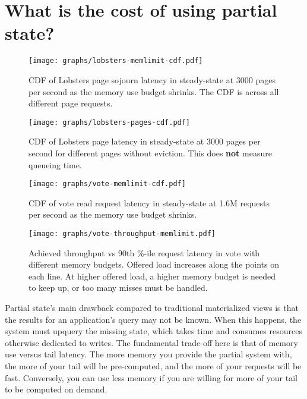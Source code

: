 \section{What is the cost of using partial state?}
\label{s:eval:cost}

\begin{figure}[h]
  \centering
  \texttt{[image: graphs/lobsters-memlimit-cdf.pdf]}
  \caption{CDF of Lobsters page sojourn latency in steady-state at 3000 pages
  per second as the memory use budget shrinks. The CDF is across all different
  page requests.}
  \label{f:lobsters-mem-latency}
\end{figure}

\begin{figure}[h]
  \centering
  \texttt{[image: graphs/lobsters-pages-cdf.pdf]}
  \caption{CDF of Lobsters page latency in steady-state at 3000 pages per second
  for different pages without eviction. This does \textbf{not} measure queueing
  time.}
  \label{f:lobsters-pages-latency}
\end{figure}

\begin{figure}[h]
  \centering
  \texttt{[image: graphs/vote-memlimit-cdf.pdf]}
  \caption{CDF of vote read request latency in steady-state at 1.6M requests per
  second as the memory use budget shrinks.}
  \label{f:vote-mem-latency}
\end{figure}

\begin{figure}[h]
  \centering
  \texttt{[image: graphs/vote-throughput-memlimit.pdf]}
  \caption{Achieved throughput vs 90th \%-ile request latency in vote with
  different memory budgets. Offered load increases along the points on each
  line. At higher offered load, a higher memory budget is needed to keep up, or
  too many misses must be handled.}
  \label{f:vote-throughput-memlimit}
\end{figure}

Partial state's main drawback compared to traditional materialized views is
that the results for an application's query may not be known. When this happens,
the system must upquery the missing state, which takes time and consumes
resources otherwise dedicated to writes. The fundamental trade-off here is that
of memory use versus tail latency. The more memory you provide the partial
system with, the more of your tail will be pre-computed, and the more of your
requests will be fast. Conversely, you can use less memory if you are willing
for more of your tail to be computed on demand.

